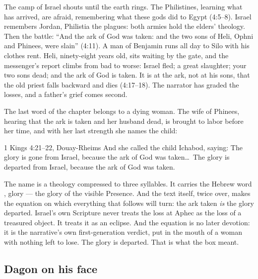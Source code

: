 The camp of Israel shouts until the earth rings. The Philistines, learning
what has arrived, are afraid, remembering what these gods did to Egypt
(4:5--8). Israel remembers Jordan, Philistia the plagues: both armies hold
the elders' theology. Then the battle: ``And the ark of God was taken: and
the two sons of Heli, Ophni and Phinees, were
slain'' (4:11). A man of Benjamin runs
all day to Silo with his clothes rent. Heli, ninety-eight years old, sits
waiting by the gate, and the messenger's report climbs from bad to worse:
Israel fled; a great slaughter; your two sons dead; and the ark of God is
taken. It is at the ark, not at his sons, that the old priest falls
backward and dies (4:17--18). The narrator has graded the losses, and a
father's grief comes second.

The last word of the chapter belongs to a dying woman. The wife of Phinees,
hearing that the ark is taken and her husband dead, is brought to labor
before her time, and with her last strength she names the child:

\begin{witnessbox}{1 Kings 4:21--22, Douay-Rheims}
And she called the child Ichabod, saying: The glory is gone from Israel,
because the ark of God was taken\ldots\ The glory is departed from Israel,
because the ark of God was taken.
\end{witnessbox}

The name is a theology compressed to three syllables. It carries the Hebrew word , glory --- the glory of
the visible Presence. And the text itself, twice over, makes the equation
on which everything that follows will turn: the ark taken \emph{is} the
glory departed. Israel's own Scripture never treats the loss at Aphec as
the loss of a treasured object. It treats it as an eclipse. And the
equation is no later devotion: it is the narrative's own first-generation
verdict, put in the mouth of a woman with nothing left to lose. The glory is departed. That is what the box meant.

\subsection{Dagon on his face}

